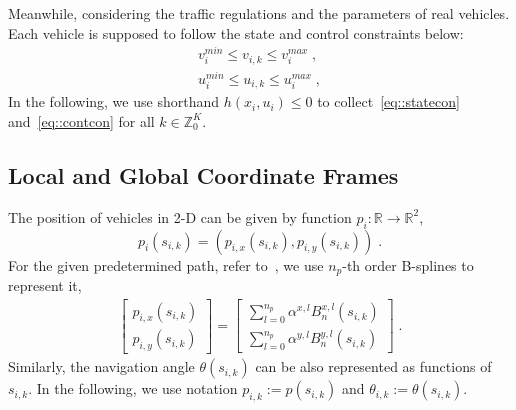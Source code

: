 \documentclass[letterpaper, 10 pt, conference]{ieeeconf}
\begin{document}
Meanwhile, considering the traffic regulations and the parameters of real vehicles. Each vehicle is supposed to follow the state and control constraints below:
\begin{align}
v_i^{min} \leq v_{i,k} \leq v_i^{max} \; , \label{eq::statecon} \\
u_i^{min} \leq u_{i,k} \leq u_i^{max} \; , \label{eq::contcon}
\end{align}
In the following, we use shorthand
$
h(x_{i},u_{i})\leq 0
$
to collect~\eqref{eq::statecon} and~\eqref{eq::contcon} for all $k\in \mathbb{Z}_0^{K}$.

\subsection{Local and Global Coordinate Frames}
The position of vehicles in 2-D can be given by function $p_i:\mathbb{R}\rightarrow \mathbb{R}^2$,
\[
p_i(s_{i,k}) =(p_{i,x}(s_{i,k}),p_{i,y}(s_{i,k}))\;.
\] 
For the given predetermined path, refer to~\cite{Katriniok2019}, we use $n_p$-th order B-splines to represent it,
\begin{align}
\left[
\begin{matrix}
p_{i,x}(s_{i,k}) \\[0.16cm]
p_{i,y}(s_{i,k})
\end{matrix}
\right] =
\left[
\begin{matrix}
\sum_{l=0}^{n_{p}}\alpha^{x,l}B^{x,l}_n(s_{i,k}) \\[0.16cm]
\sum_{l=0}^{n_{p}}\alpha^{y,l}B^{y,l}_n(s_{i,k})
\end{matrix}
\right]\;.
\end{align}
Similarly, the navigation angle $\theta(s_{i,k})$ can be also represented as functions of $s_{i,k}$. In the following, we use notation $p_{i,k}:=p(s_{i,k})$ and $\theta_{i,k}:=\theta(s_{i,k})$.
\end{document}
